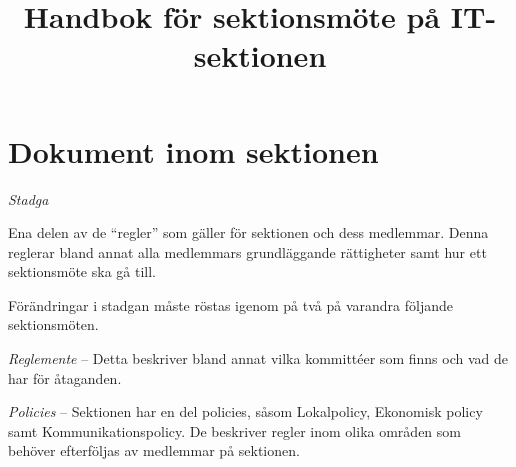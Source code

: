 \documentclass[11pt, noincludeaddress]{classes/cthit}
\let\tempone\itemize
\let\temptwo\enditemize
\renewenvironment{itemize}{\tempone\addtolength{\itemsep}{-0.3\baselineskip}}{\temptwo}
\begin{document}
\title{Handbok för sektionsmöte på IT-sektionen}

\makeheadfoot%
\makesimpletitle

\tableofcontents
\newpage

\setcounter{page}{1}



\section{Dokument inom sektionen}
\begin{itemize}
    \item \textit{Stadga}
    \begin{itemize}
        \item Ena delen av de “regler” som gäller för sektionen och dess medlemmar. Denna reglerar bland annat alla medlemmars grundläggande rättigheter samt hur ett sektionsmöte ska gå till.
        \item Förändringar i stadgan måste röstas igenom på två på varandra följande sektionsmöten.
    \end{itemize}
    \item \textit{Reglemente} -- Detta beskriver bland annat vilka kommittéer som finns och vad de har för åtaganden.
    \item \textit{Policies} -- Sektionen har en del policies, såsom Lokalpolicy, Ekonomisk policy samt Kommunikationspolicy. De beskriver regler inom olika områden som behöver efterföljas av medlemmar på sektionen.
\end{itemize}
\end{document}
